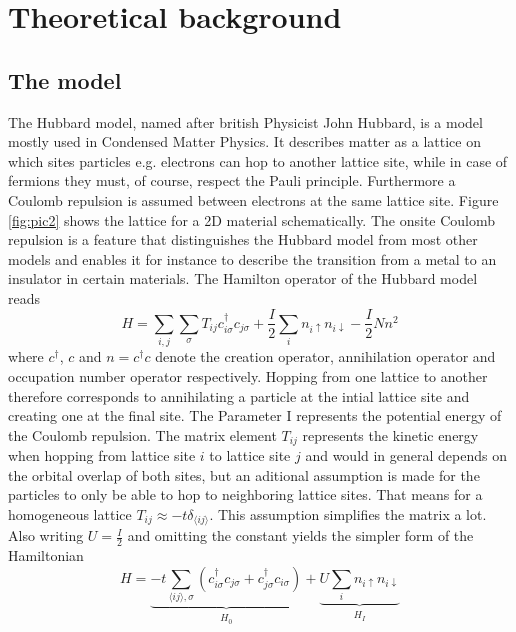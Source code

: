 

\section{Theoretical background}
\subsection{The model}
The Hubbard model, named after british Physicist John Hubbard, is a model mostly used in Condensed Matter Physics. It describes matter as a lattice on which sites particles e.g. electrons can hop to another lattice site, while in case of fermions they must, of course, respect the Pauli principle. Furthermore a Coulomb repulsion is assumed between electrons at the same lattice site. Figure \ref{fig:pic2} shows the lattice for a 2D material schematically. The onsite Coulomb repulsion is a feature that distinguishes the Hubbard model from most other models and enables it for instance to describe the transition from a metal to an insulator in certain materials. The Hamilton operator of the Hubbard model reads
\begin{equation}\label{Hubbard_original}
H = \sum_{i,j}\sum_{\sigma}T_{ij} c_{i\sigma}^\dag c_{j\sigma} + \frac{I}{2} \sum_{i}n_{i\uparrow}n_{i\downarrow} - \frac{I}{2}Nn^2
\end{equation}
where $ c^\dag $,  $ c $ and $ n = c^\dag c $ denote the creation operator, annihilation operator and occupation number operator respectively. Hopping from one lattice to another therefore corresponds to annihilating a particle at the intial lattice site and creating one at the final site. The Parameter I represents the potential energy of the Coulomb repulsion. The matrix element $ T_{ij} $ represents the kinetic energy when hopping from lattice site $i$ to lattice site $j$ and would in general depends on the orbital overlap of both sites, but an aditional assumption is made for the particles to only be able to hop to neighboring lattice sites.  That means for a homogeneous lattice $ T_{ij} \approx -t\delta_{\langle ij \rangle} $. This assumption simplifies the matrix a lot. Also writing  $ U = \frac{I}{2} $ and omitting the constant yields the simpler form of the Hamiltonian
\begin{equation}\label{Hubbard_standard}
H = \underbrace{-t\sum_{\langle ij\rangle,\sigma}\left( c_{i\sigma}^\dag c_{j\sigma} + c_{j\sigma}^\dag c_{i\sigma}\right)}_{\substack{H_0}}  + \underbrace{U \sum_{i}n_{i\uparrow}n_{i\downarrow}}_{\substack{H_I}}
\end{equation}

